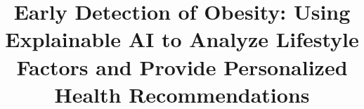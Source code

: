 







\title{Early Detection of Obesity: Using Explainable AI to Analyze Lifestyle Factors and Provide Personalized Health Recommendations}






